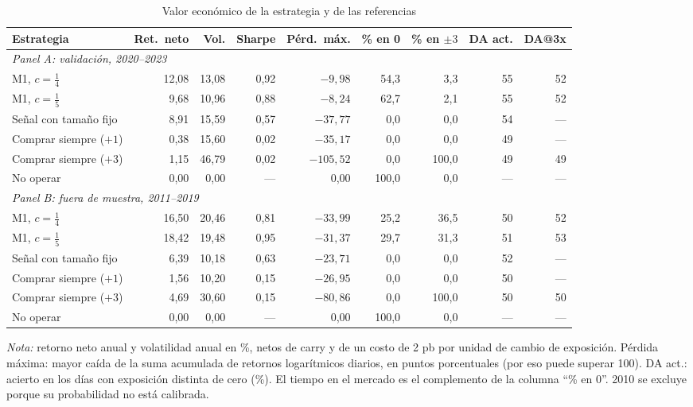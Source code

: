 \documentclass[11pt,a4paper]{article}
\begin{document}
\begin{table}[htbp]\centering\small
\caption{Valor económico de la estrategia y de las referencias}\label{tab:economico}
\begin{threeparttable}
\begin{tabular}{l rrrr rr rr}
\toprule
Estrategia & Ret.\ neto & Vol. & Sharpe & Pérd.\ máx. & \% en 0 & \% en $\pm3$ & DA act. & DA@3x \\
\midrule
\multicolumn{9}{l}{\emph{Panel A: validación, 2020--2023}} \\
M1, $c=\tfrac14$ & 12,08 & 13,08 & 0,92 & $-9{,}98$ & 54,3 & 3,3 & 55 & 52 \\
M1, $c=\tfrac15$ & 9,68 & 10,96 & 0,88 & $-8{,}24$ & 62,7 & 2,1 & 55 & 52 \\
Señal con tamaño fijo & 8,91 & 15,59 & 0,57 & $-37{,}77$ & 0,0 & 0,0 & 54 & --- \\
Comprar siempre ($+1$) & 0,38 & 15,60 & 0,02 & $-35{,}17$ & 0,0 & 0,0 & 49 & --- \\
Comprar siempre ($+3$) & 1,15 & 46,79 & 0,02 & $-105{,}52$ & 0,0 & 100,0 & 49 & 49 \\
No operar & 0,00 & 0,00 & --- & 0,00 & 100,0 & 0,0 & --- & --- \\
\midrule
\multicolumn{9}{l}{\emph{Panel B: fuera de muestra, 2011--2019}} \\
M1, $c=\tfrac14$ & 16,50 & 20,46 & 0,81 & $-33{,}99$ & 25,2 & 36,5 & 50 & 52 \\
M1, $c=\tfrac15$ & 18,42 & 19,48 & 0,95 & $-31{,}37$ & 29,7 & 31,3 & 51 & 53 \\
Señal con tamaño fijo & 6,39 & 10,18 & 0,63 & $-23{,}71$ & 0,0 & 0,0 & 52 & --- \\
Comprar siempre ($+1$) & 1,56 & 10,20 & 0,15 & $-26{,}95$ & 0,0 & 0,0 & 50 & --- \\
Comprar siempre ($+3$) & 4,69 & 30,60 & 0,15 & $-80{,}86$ & 0,0 & 100,0 & 50 & 50 \\
No operar & 0,00 & 0,00 & --- & 0,00 & 100,0 & 0,0 & --- & --- \\
\bottomrule
\end{tabular}
\begin{tablenotes}\footnotesize
\item \emph{Nota:} retorno neto anual y volatilidad anual en \%, netos de carry y de un costo de 2 pb por unidad de cambio de exposición. Pérdida máxima: mayor caída de la suma acumulada de retornos logarítmicos diarios, en puntos porcentuales (por eso puede superar 100). DA act.: acierto en los días con exposición distinta de cero (\%). El tiempo en el mercado es el complemento de la columna ``\% en 0''. 2010 se excluye porque su probabilidad no está calibrada.
\end{tablenotes}
\end{threeparttable}
\end{table}
\end{document}
